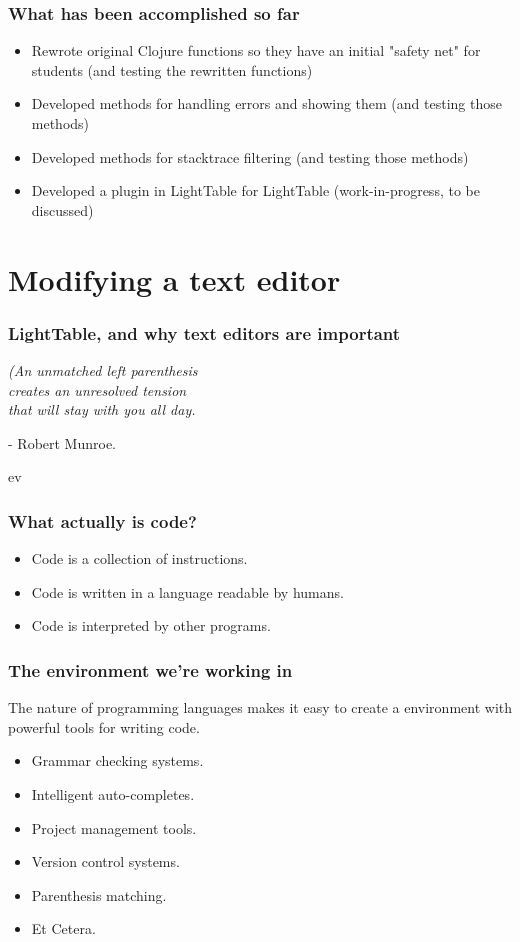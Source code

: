 \documentclass{beamer}
\begin{document}
\begin{frame}[fragile]
\frametitle{What has been accomplished so far}
\begin{itemize}
\item Rewrote original Clojure functions so they have an initial "safety net" for students (and testing the rewritten functions)
\item Developed methods for handling errors and showing them (and testing those methods)
\item Developed methods for stacktrace filtering (and testing those methods)
\item Developed a plugin in LightTable for LightTable (work-in-progress, to be discussed)
\end{itemize}
\end{frame}

\section{Modifying a text editor}

\begin{frame}
\frametitle{LightTable, and why text editors are important}
	\begin{center}
	{\em (An unmatched left parenthesis\\ creates an unresolved tension\\ that will stay with you all day.}	

	\vspace*{2\baselineskip}
	- Robert Munroe.
	\end{center}
\end{frame}
ev
\begin{frame}
\frametitle{What actually is code?}
	\begin{itemize}
	\item Code is a collection of instructions.
	\item Code is written in a language readable by humans.
	\item Code is interpreted by other programs.
	\end{itemize}
\end{frame}

\begin{frame}
\frametitle{The environment we're working in}
	The nature of programming languages makes it easy to create a environment with powerful tools for writing code.
	{\em
	\begin{itemize}
	\item Grammar checking systems.
	\item Intelligent auto-completes.
	\item Project management tools.
	\item Version control systems.
	\item Parenthesis matching.
	\item Et Cetera.
	\end{itemize}
	}
\end{frame}

\end{document}
